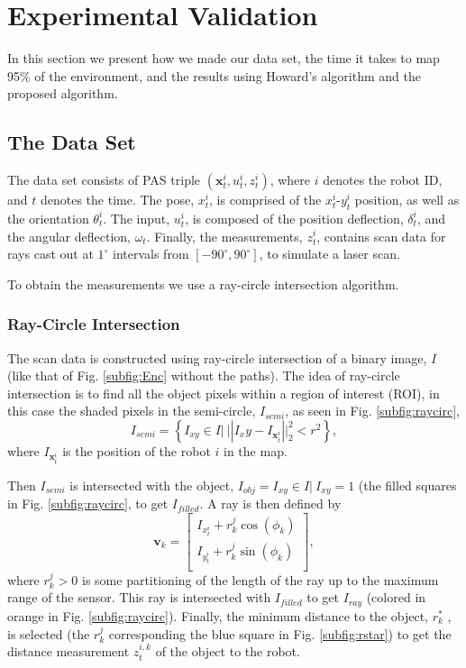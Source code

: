 \section{Experimental Validation}
\label{S:Exp}

In this section we present how we made our data set, the time it takes to map 95\% of the environment, and the results using Howard's algorithm and the proposed algorithm.  




\subsection{The Data Set}
\label{S:Exp:DataSet}

The data set consists of PAS triple $(\textbf{x}^i_t,u^i_t,z^i_t)$, where $i$ denotes the robot ID, and $t$ denotes the time.  The pose, $x^i_t$, is comprised of the $x_t^i$-$y^i_t$ position, as well as the orientation $\theta^i_t$.  The input, $u^i_t$, is composed of the position deflection, $\delta^i_t$, and the angular deflection, $\omega_t$.  Finally, the measurements, $z^i_t$, contains scan data for rays cast out at $1^\circ$ intervals from $[-90^\circ,90^\circ]$, to simulate a laser scan.  

To obtain the measurements we use a ray-circle intersection algorithm.

\subsubsection{Ray-Circle Intersection}

The scan data is constructed using ray-circle intersection of a binary image, $I$ (like that of Fig. \ref{subfig:Enc} without the paths).  The idea of ray-circle intersection is to find all the object pixels within a region of interest (ROI), in this case the shaded pixels in the semi-circle, $I_{semi}$, as seen in Fig. \ref{subfig:raycirc}, 
\begin{equation}
I_{semi}=\left\{I_{xy}\in I |\  ||I_xy-I_{\textbf{x}_t^i}||_2^2<r^2 \right\},
\label{eq:Isemi}
\end{equation}
where $I_{\textbf{x}_t^i}$ is the position of the robot $i$ in the map.

Then $I_{semi}$ is intersected with the object, $I_{obj}={I_{xy}\in I | \ I_{xy}=1}$ (the filled squares in Fig. \ref{subfig:raycirc}, to get $I_{filled}$.  A ray is then defined by 
\begin{equation}
\textbf{v}_k=\begin{bmatrix}
I_{x_t^i}+r_k^j \cos(\phi_k)\\
I_{y_t^i}+r_k^j \sin(\phi_k)\\
\end{bmatrix}, 
\label{eq:ray}
\end{equation}
where $r_k^j>0$ is some partitioning of the length of the ray up to the maximum range of the sensor.  This ray is intersected with $I_{filled}$ to get $I_{ray}$ (colored in orange in Fig. \ref{subfig:raycirc}).  Finally, the minimum distance to the object, $r_{k}^*$ , is selected (the $r_k^j$ corresponding the blue square in Fig. \ref{subfig:rstar}) to get the distance measurement $z_t^{i,k}$ of the object to the robot.  

